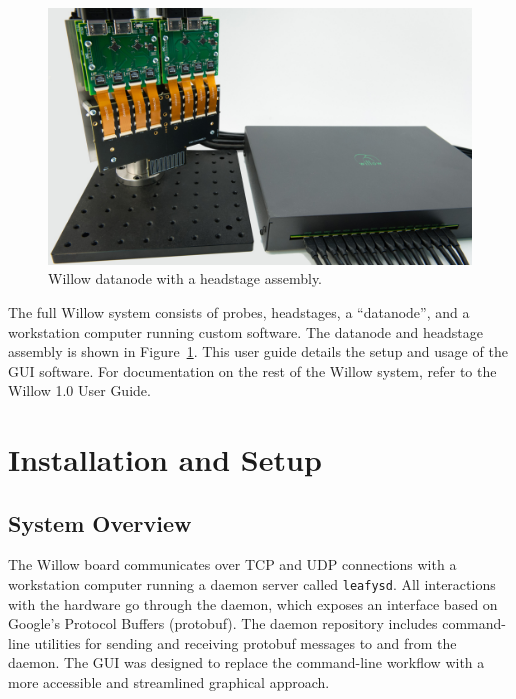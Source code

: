 \begin{figure}[h!]
\begin{center}
\includegraphics[width=12cm]{screenshots/willow_photoshoot_downsampled.jpg}
\end{center}
\caption{Willow datanode with a headstage assembly.}
\label{fig_hw}
\end{figure}

The full Willow system consists of probes, headstages, a ``datanode'', and a workstation computer running custom software. The datanode and headstage assembly is shown in Figure~\ref{fig_hw}. This user guide details the setup and usage of the GUI software. For documentation on the rest of the Willow system, refer to the Willow 1.0 User Guide.


\section{Installation and Setup}
\label{sec_setup}

\subsection{System Overview}

The Willow board communicates over TCP and UDP connections with a workstation computer running a daemon server called \texttt{leafysd}. All interactions with the hardware go through the daemon, which exposes an interface based on Google's Protocol Buffers (protobuf). The daemon repository includes command-line utilities for sending and receiving protobuf messages to and from the daemon. The GUI was designed to replace the command-line workflow with a more accessible and streamlined graphical approach.

